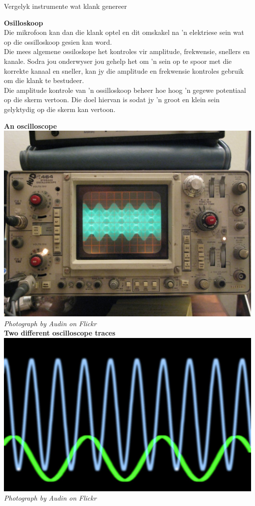 \begin{activity}{Vergelyk instrumente wat klank genereer}
\begin{minipage}{.5\textwidth}

\textbf{Osilloskoop} \\
Die mikrofoon kan dan die klank optel en dit omskakel na 'n elektriese sein wat op die ossilloskoop gesien kan word.\\

Die mees algemene ossiloskope het kontroles vir amplitude, frekwensie, snellers en kanale. Sodra jou onderwyser jou gehelp het om 'n sein op te spoor met die korrekte kanaal en sneller, kan jy die amplitude en frekwensie kontroles gebruik om die klank te bestudeer.\\

Die amplitude kontrole van 'n ossilloskoop beheer hoe hoog 'n gegewe potentiaal op die skerm vertoon. Die doel hiervan is sodat jy 'n groot en klein sein gelyktydig op die skerm kan vertoon. \\

\end{minipage}
\begin{minipage}{.5\textwidth}
\begin{center}
\textbf{An oscilloscope}\\
\includegraphics[width=.8\textwidth]{../Grade10/photos/oscilloscope_Audin_Flickr.jpg}\\
\textsl{Photograph by Audin on Flickr}\\
\textbf{Two different oscilloscope traces}\\
\includegraphics[width=.8\textwidth]{../Grade10/photos/oscilloscopetrace_Creativity103_Flickr.jpg}\\
\textsl{Photograph by Audin on Flickr}\\
\end{center}
\end{minipage}


\end{activity}
